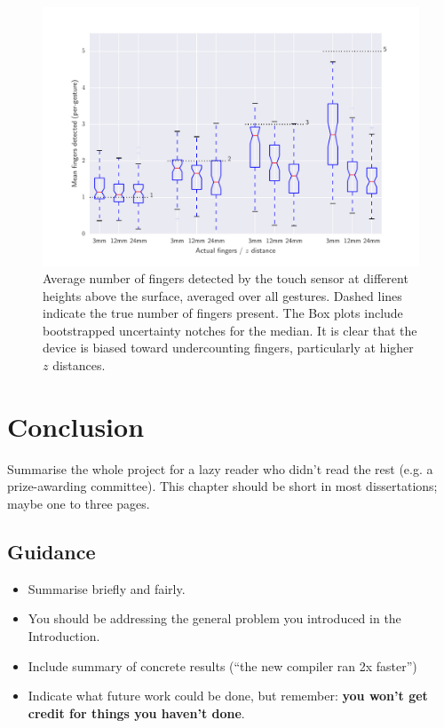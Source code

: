 \documentclass{l4proj}
\begin{document}
\begin{figure}[htb]
    \centering
    \includegraphics[width=1.0\linewidth]{figures/boxplot_finger_distance.pdf}    

    \caption{Average number of fingers detected by the touch sensor at different heights above the surface, averaged over all gestures. Dashed lines indicate
    the true number of fingers present. The Box plots include bootstrapped uncertainty notches for the median. It is clear that the device is biased toward 
    undercounting fingers, particularly at higher $z$ distances.
    }

    \label{fig:boxplot} 
\end{figure}


\chapter{Conclusion}    
Summarise the whole project for a lazy reader who didn't read the rest (e.g. a prize-awarding committee). This chapter should be short in most dissertations; maybe one to three pages.
\section{Guidance}
\begin{itemize}
    \item
        Summarise briefly and fairly.
    \item
        You should be addressing the general problem you introduced in the
        Introduction.        
    \item
        Include summary of concrete results (``the new compiler ran 2x
        faster'')
    \item
        Indicate what future work could be done, but remember: \textbf{you
        won't get credit for things you haven't done}.
\end{itemize}
\end{document}

